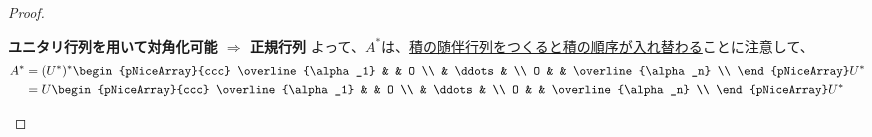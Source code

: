 \documentclass[../../../topic_linear-algebra]{subfiles}
\begin{document}
\begin{proof}
\begin{subpattern}{\bfseries ユニタリ行列を用いて対角化可能 $\Longrightarrow$ 正規行列}
    よって、$A^*$は、\hyperref[thm:adjoint-of-product]{積の随伴行列をつくると積の順序が入れ替わる}ことに注意して、
    \begin{align*}
      A^* & = (U^*)^* \begin{pNiceArray}{ccc}
                        \overline{\alpha_1} & & O \\
                        &  \ddots & \\
                        O & & \overline{\alpha_n} \\
                      \end{pNiceArray} U^* \\
          & = U \begin{pNiceArray}{ccc}
                  \overline{\alpha_1} & & O \\
                  &  \ddots & \\
                  O & & \overline{\alpha_n} \\
                \end{pNiceArray} U^*
    \end{align*}

    \br


\end{subpattern}
\end{proof}
\end{document}
